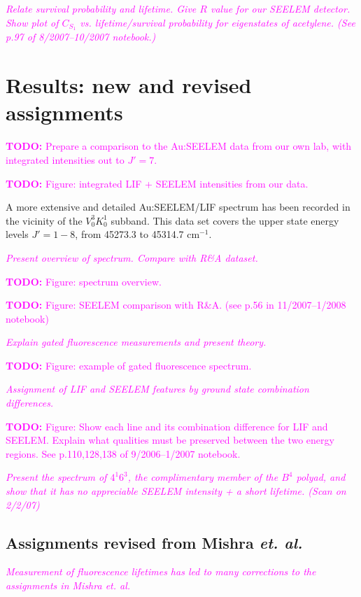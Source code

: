\documentclass[12pt]{mitthesis}
\newcommand{\TODO} [1]{\textcolor{magenta}{\textbf{TODO:} #1}}
\newcommand{\POINT}[1]{\textcolor{magenta}{\emph{#1}}}
\newcommand{\rcm}{cm$^{-1}$}
\begin{document}
\POINT{Relate survival probability and lifetime. Give $R$ value for
  our SEELEM detector.  Show plot of $C_{S_1}$ vs. lifetime/survival
  probability for eigenstates of acetylene.  (See p.97 of
  8/2007--10/2007 notebook.)}

\section{Results: new and revised assignments}

\TODO{Prepare a comparison to the Au:SEELEM data from our own lab, with
integrated intensities out to $J' = 7$.}

\TODO{Figure: integrated LIF + SEELEM intensities from our data.}



A more extensive and detailed Au:SEELEM/LIF spectrum has been recorded
in the vicinity of the $V^3_0K^1_0$ subband. This data set covers the
upper state energy levels $J'=1-8$, from 45273.3 to 45314.7 \rcm.

\POINT{Present overview of spectrum.  Compare with R\&A dataset.}

\TODO{Figure: spectrum overview.}

\TODO{Figure: SEELEM comparison with R\&A. (see p.56 in
  11/2007--1/2008 notebook)}

\POINT{Explain gated fluorescence measurements and present theory.}

\TODO{Figure: example of gated fluorescence spectrum.}

\POINT{Assignment of LIF and SEELEM features by ground state
  combination differences.}

\TODO{Figure: Show each line and its combination difference for LIF
  and SEELEM.  Explain what qualities must be preserved between the
  two energy regions.  See p.110,128,138 of 9/2006--1/2007 notebook.}

\POINT{Present the spectrum of $4^1 6^3$, the complimentary member of
  the $B^4$ polyad, and show that it has no appreciable SEELEM
  intensity + a short lifetime. (Scan on 2/2/07)}

\subsection{Assignments revised from Mishra \emph{et. al.}}

\POINT{Measurement of fluorescence lifetimes has led to many
  corrections to the assignments in Mishra \emph{et. al.}}
\end{document}
